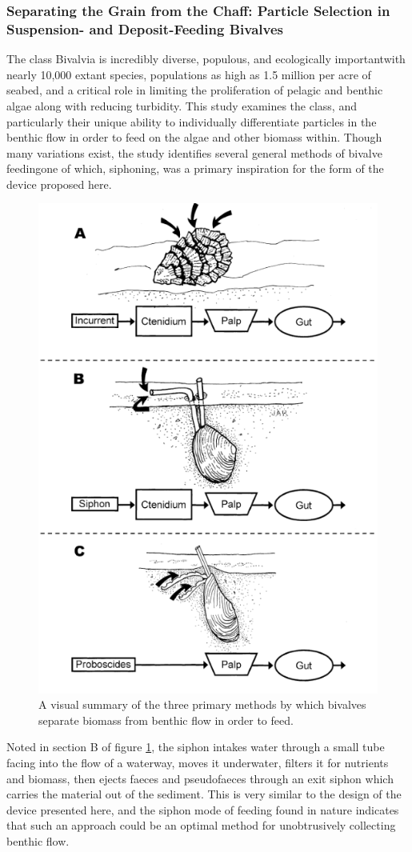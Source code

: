 \documentclass[fleqn,10pt]{SelfArx} %
\begin{document}
	\subsubsection*{Separating the Grain from the Chaff: Particle Selection in Suspension- and Deposit-Feeding Bivalves}
	The class Bivalvia is incredibly diverse, populous, and ecologically important\textemdash with nearly 10,000 extant species, populations as high as 1.5 million per acre of seabed, and a critical role in limiting the proliferation of \gls{pelagic} and \gls{benthic} algae along with reducing turbidity. This study examines the class, and particularly their unique ability to individually differentiate particles in the \gls{benthic} flow in order to feed on the algae and other biomass within. Though many variations exist, the study identifies several general methods of bivalve feeding\textemdash one of which, siphoning, was a primary inspiration for the form of the device proposed here. 
	\begin{figure}[h]
		\centering
		\includegraphics[width=0.5\linewidth]{Figures/BivalveInspo.png}
		\caption[Bivalve Filter-Feeding Techniques]{A visual summary of the three primary methods by which bivalves separate biomass from \gls{benthic} flow in order to feed.}
		\label{fig:SiphonInspo}
	\end{figure}
	Noted in section B of figure \ref{fig:SiphonInspo}, the siphon intakes water through a small tube facing into the flow of a waterway, moves it underwater, filters it for nutrients and biomass, then ejects faeces and pseudofaeces through an exit siphon which carries the material out of the sediment. This is very similar to the design of the device presented here, and the siphon mode of feeding found in nature indicates that such an approach could be an optimal method for unobtrusively collecting \gls{benthic} flow. 
	
\end{document}
